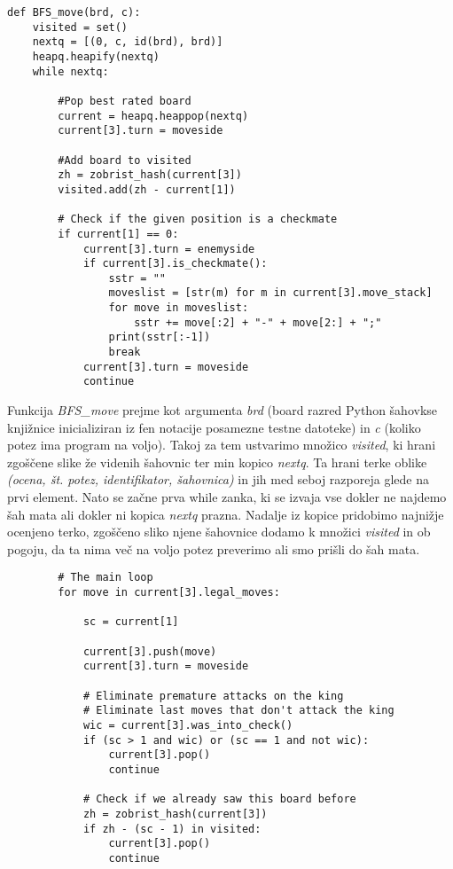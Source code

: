 \documentclass[runningheads]{llncs}
\begin{document}
\begin{lstlisting}
def BFS_move(brd, c):
    visited = set()
    nextq = [(0, c, id(brd), brd)]
    heapq.heapify(nextq)
    while nextq:
		
		#Pop best rated board
        current = heapq.heappop(nextq)
        current[3].turn = moveside
		
		#Add board to visited
        zh = zobrist_hash(current[3])
        visited.add(zh - current[1])
        
        # Check if the given position is a checkmate
        if current[1] == 0:
            current[3].turn = enemyside
            if current[3].is_checkmate():
                sstr = ""
                moveslist = [str(m) for m in current[3].move_stack]
                for move in moveslist:
                    sstr += move[:2] + "-" + move[2:] + ";"
                print(sstr[:-1])
                break
            current[3].turn = moveside
            continue
\end{lstlisting}
Funkcija \textit{BFS\_move} prejme kot argumenta \textit{brd} (board razred Python šahovkse knjižnice inicializiran iz fen notacije posamezne testne datoteke) in \textit{c} (koliko potez ima program na voljo). Takoj za tem ustvarimo množico \textit{visited}, ki hrani zgoščene slike že videnih šahovnic ter min kopico \textit{nextq}. Ta hrani terke oblike \textit{(ocena, št. potez, identifikator, šahovnica)} in jih med seboj razporeja glede na prvi element. Nato se začne prva while zanka, ki se izvaja vse dokler ne najdemo šah mata ali dokler ni kopica \textit{nextq} prazna. Nadalje iz kopice pridobimo najnižje ocenjeno terko, zgoščeno sliko njene šahovnice dodamo k množici \textit{visited} in ob pogoju, da ta nima več na voljo potez preverimo ali smo prišli do šah mata.
\begin{lstlisting}
        # The main loop
        for move in current[3].legal_moves:

            sc = current[1]

            current[3].push(move)
            current[3].turn = moveside

            # Eliminate premature attacks on the king
            # Eliminate last moves that don't attack the king
            wic = current[3].was_into_check()
            if (sc > 1 and wic) or (sc == 1 and not wic):
                current[3].pop()
                continue

            # Check if we already saw this board before
            zh = zobrist_hash(current[3])
            if zh - (sc - 1) in visited:
                current[3].pop()
                continue
\end{lstlisting}
\end{document}
